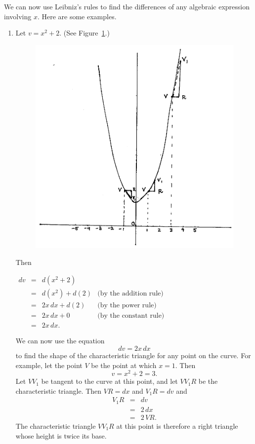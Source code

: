 \documentclass[polutonikogreek,english,twoside,openright]{article}
\begin{document}
We can now use Leibniz's rules to find the differences of any algebraic expression involving $x$.  Here are some examples.
\begin{enumerate}
\item \label{ex1} Let $v= x^2 + 2.$  (See Figure~\ref{parex}.)
\begin{figure}[htp]
\begin{center}
\includegraphics[width=.85\textwidth]{fig/Figure11}
\caption{}
\label{parex}
\vspace{-10pt}
\end{center}
\end{figure} 
Then
\begin{center}

$\begin{array}{ccll}
dv & = & d(x^2 + 2) & \\
 & = & d(x^2) + d(2) & \mbox{(by the addition rule)}\\
 & = & 2x\,dx + d(2) & \mbox{(by the power rule)}\\
 & = & 2x\,dx + 0 & \mbox{(by the constant rule)}\\
 & = & 2x\,dx. & 
\end{array}$
\end{center}

We can now use the equation
$$dv = 2x\,dx$$
to find the shape of the characteristic triangle for any point on the
curve.  For example, let the point $V$ be the point at which $x = 1$.
Then
$$v = x^2 + 2 = 3.$$
Let $VV_1$ be tangent to the curve at this point, and let $VV_1R$ be
the characteristic triangle.  Then $VR = dx$ and $V_1R = dv$ and
\begin{eqnarray*}
V_1R & =  & dv\\
& = & 2\,dx\\
& = & 2\,VR.
\end{eqnarray*}
The characteristic triangle $VV_1R$ at this point is therefore a right
triangle whose height is twice its base.


\end{enumerate}
\end{document}
